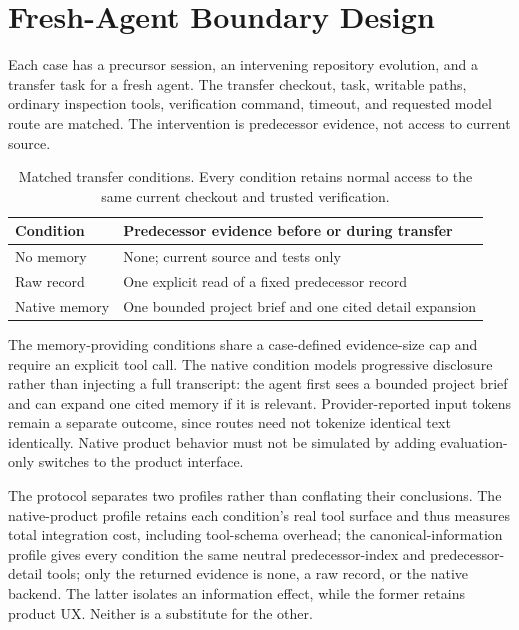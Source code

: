 \documentclass[10pt,conference]{IEEEtran}
\begin{document}
\section{Fresh-Agent Boundary Design}

Each case has a precursor session, an intervening repository evolution, and a
transfer task for a fresh agent. The transfer checkout, task, writable paths,
ordinary inspection tools, verification command, timeout, and requested model
route are matched. The intervention is predecessor evidence, not access to
current source.

\begin{table}[t]
\caption{Matched transfer conditions. Every condition retains normal access to
the same current checkout and trusted verification.}\label{tab:conditions}
\centering
\small
\begin{tabular}{p{}p{}}
\toprule
Condition & Predecessor evidence before or during transfer \\
\midrule
No memory & None; current source and tests only \\
Raw record & One explicit read of a fixed predecessor record \\
Native memory & One bounded project brief and one cited detail expansion \\
\bottomrule
\end{tabular}
\end{table}

The memory-providing conditions share a case-defined evidence-size cap and
require an explicit tool call. The native condition models progressive disclosure
rather than injecting a full transcript: the agent first sees a bounded project
brief and can expand one cited memory if it is relevant. Provider-reported input
tokens remain a separate outcome, since routes need not tokenize identical text
identically. Native product behavior must not be simulated by adding
evaluation-only switches to the product interface.

The protocol separates two profiles rather than conflating their conclusions.
The native-product profile retains each condition's real tool surface and thus
measures total integration cost, including tool-schema overhead; the
canonical-information profile gives every condition the same neutral
predecessor-index and predecessor-detail tools; only the returned evidence is
none, a raw record, or the native backend. The latter isolates an information
effect, while the former retains product UX\@. Neither is a substitute for the
other.
\end{document}
